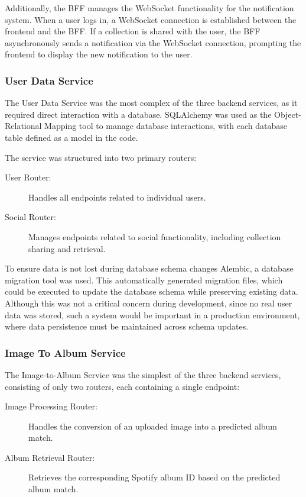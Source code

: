 Additionally, the BFF manages the WebSocket functionality for the notification system. When a user logs in, a WebSocket connection is established between the frontend and the BFF. If a collection is shared with the user, the BFF asynchronously sends a notification via the WebSocket connection, prompting the frontend to display the new notification to the user.

\subsubsection{User Data Service}
The User Data Service was the most complex of the three backend services, as it required direct interaction with a database. SQLAlchemy was used as the Object-Relational Mapping tool to manage database interactions, with each database table defined as a model in the code.

The service was structured into two primary routers:

\begin{description}
    \item[User Router:] Handles all endpoints related to individual users.
    \item[Social Router:] Manages endpoints related to social functionality, including collection sharing and retrieval.
\end{description}

To ensure data is not lost during database schema changes Alembic, a database migration tool was used. This automatically generated migration files, which could be executed to update the database schema while preserving existing data. Although this was not a critical concern during development, since no real user data was stored, such a system would be important in a production environment, where data persistence must be maintained across schema updates.

\subsubsection{Image To Album Service}
The Image-to-Album Service was the simplest of the three backend services, consisting of only two routers, each containing a single endpoint:

\begin{description}
    \item[Image Processing Router:] Handles the conversion of an uploaded image into a predicted album match.
    \item[Album Retrieval Router:] Retrieves the corresponding Spotify album ID based on the predicted album match.
\end{description}

